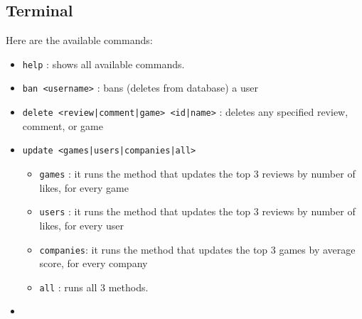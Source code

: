 \subsection{Terminal}
Here are the available commands:
\begin{itemize}
    \item \texttt{help} : shows all available commands.
    \item \texttt{ban <username>} : bans (deletes from database) a user
    \item \texttt{delete <review|comment|game> <id|name>} : deletes any specified review, comment, or game
    \item \texttt{update <games|users|companies|all>}
        \begin{itemize}
            \item \texttt{games} : it runs the method that updates the top 3 reviews by number of likes, for every game
            \item \texttt{users} : it runs the method that updates the top 3 reviews by number of likes, for every user
            \item \texttt{companies}: it runs the method that updates the top 3 games by average score, for every company
            \item \texttt{all} : runs all 3 methods.
        \end{itemize}
    \item 
    
\end{itemize}